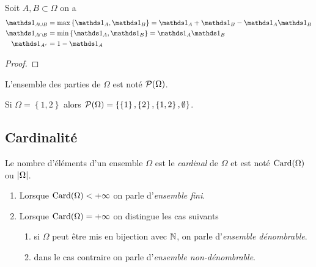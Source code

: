 \begin{proposition}
	Soit $A, B \subset \Omega$ on a
	\begin{align*}
		\one_{A\cup B} &= \max \left\{ \one_A, \one_B \right\} = \one_A + \one_B - \one_A \one_B\\
		\one_{A\cap B} &= \min \left\{ \one_A, \one_B \right\}  = \one_A \one_B\\
		\one_{A^c} &= 1 - \one_A
	\end{align*}
\end{proposition}
\begin{proof}
	
	\pl{\rep{5cm}}
	\pl{\rep{4cm}}
\end{proof}



\begin{definition}
L'ensemble des parties de $\Omega$ est noté $\mathcal{P}(\Omega)$. 
\end{definition}

\begin{exemple}
	Si $\Omega = \left\{ 1,2 \right\}$  alors $\mathcal{P}(\Omega) = \left\{ \left\{ 1 \right\},\left\{ 2 \right\},\left\{ 1,2 \right\}, \emptyset \right\}$.
\end{exemple}

\sld{\pagebreak[5]}%

\subsection{Cardinalité}

\begin{definition}
	Le nombre d'éléments d'un ensemble $\Omega$ est le \emph{cardinal} de $\Omega$ et est noté $\operatorname{Card}(\Omega)$ ou $ \left\lvert\Omega\right\rvert$.
	\begin{enumerate}
	\item Lorsque $\operatorname{Card}(\Omega) < +\infty$ on parle d'\emph{ensemble fini}.
	\item Lorsque $\operatorname{Card}(\Omega) = +\infty$ on distingue les cas suivants
		\begin{enumerate}
		\item si $\Omega$ peut être mis en bijection avec $\mathbb{N}$, on parle d'\emph{ensemble dénombrable}.
		\item dans le cas contraire on parle d'\emph{ensemble non-dénombrable}.
		\end{enumerate}
	\end{enumerate}
\end{definition}

